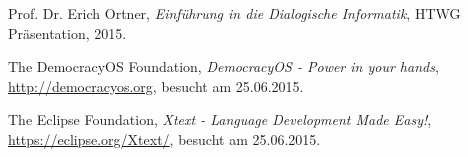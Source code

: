 \documentclass[11pt,a4paper,bibtotocnumbered]{scrreprt}
\begin{document}
\begin{singlespace}
\begin{thebibliography}{9}

  Prof. Dr. Erich Ortner,
  \emph{Einf{\"u}hrung in die Dialogische Informatik},
  HTWG Präsentation,
  2015.
  
  The DemocracyOS Foundation,
  \emph{DemocracyOS - Power in your hands},
  \url{http://democracyos.org},
  besucht am 25.06.2015.

  The Eclipse Foundation,
  \emph{Xtext - Language Development Made Easy!},
  \url{https://eclipse.org/Xtext/},
  besucht am 25.06.2015.

\end{thebibliography}
\end{singlespace}
\end{document}
